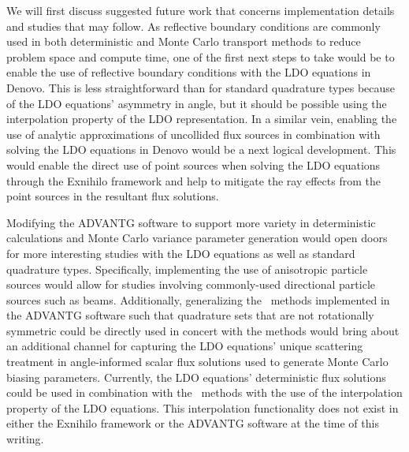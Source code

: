 We will first discuss suggested future work that concerns implementation details and studies that
may follow. As reflective boundary conditions are commonly used in both deterministic and Monte
Carlo transport methods to reduce problem space and compute time, one of the first next steps to
take would be to enable the use of reflective boundary conditions with the LDO equations in
Denovo. This is less straightforward than for standard quadrature types because of the LDO
equations' asymmetry in angle, but it should be possible using the interpolation property of the 
LDO representation. In a similar vein, enabling the use of analytic approximations of uncollided 
flux sources in combination with solving the LDO equations in Denovo would be a next logical 
development. This would enable the direct use of point sources when solving the LDO equations
through the Exnihilo framework and help to mitigate the ray effects from the point sources in the
resultant flux solutions.

Modifying the ADVANTG software to support more variety in deterministic calculations and Monte
Carlo variance parameter generation would open doors for more interesting studies with the LDO
equations as well as standard quadrature types. Specifically, implementing the use of anisotropic
particle sources would allow for studies involving commonly-used directional particle sources such
as beams. Additionally, generalizing the \fwco\ methods implemented in the ADVANTG
software such that quadrature sets that are not rotationally symmetric could be directly used in 
concert with the methods would bring about an additional channel for capturing the LDO equations'
unique scattering treatment in angle-informed scalar flux solutions used to generate Monte Carlo 
biasing parameters. Currently, the LDO equations' deterministic flux solutions could be used in 
combination with the \fwco\ methods with the use of the interpolation property of
the LDO equations. This interpolation functionality does not exist in either the Exnihilo
framework or the ADVANTG software at the time of this writing.

